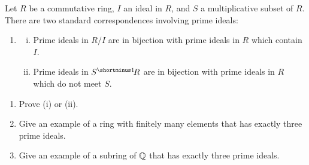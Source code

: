 \begin{question}[subtitle = January 2020 Problem 3,ID=Jan20_3]
Let $R$ be a commutative ring, $I$ an ideal in $R$, and $S$ a multiplicative subset of $R$. There are two standard correspondences involving prime ideals:
\begin{enumerate}
\item[]
\begin{enumerate}[(i)]
    \item Prime ideals in $R/I$ are in bijection with prime ideals in $R$ which contain $I$.
    \item Prime ideals in $S\linv R$ are in bijection with prime ideals in $R$ which do not meet $S$.
\end{enumerate}
\end{enumerate}

\begin{enumerate}
    \item Prove (i) or (ii).
    \item Give an example of a ring with finitely many elements that has exactly three prime ideals.
    \item Give an example of a subring of $\mathbb{Q}$ that has exactly three prime ideals.
\end{enumerate}
\end{question}
